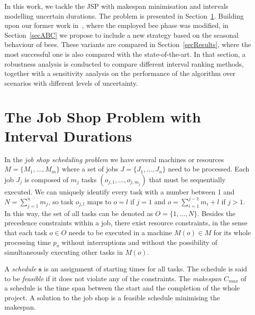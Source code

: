\documentclass[icae]{iosart2x}
\newcommand{\reviewed}[1]{#1} %
\begin{document}
In this work, we tackle the JSP with makespan minimisation and intervals modelling uncertain durations. The problem is presented in Section~\ref{secIJSP}. Building upon our former work in~\cite{Diaz2022}, where the employed bee phase was modified, in Section~\ref{secABC} we propose to include a new strategy based on the seasonal behaviour of bees. These variants are compared in Section~\ref{secResults}, where the most successful one is also compared with the state-of-the-art. In that section, a robustness analysis is conducted to compare different interval ranking methods, together with a sensitivity analysis on the performance of the algorithm over scenarios with different levels of uncertainty.

\section{The Job Shop Problem with Interval Durations}\label{secIJSP}
In the \emph{job shop scheduling problem} we have several \reviewed{machines or} resources $M=\{M_1, \dots, M_m\}$ where a set of jobs $J=\{J_1,\dots,J_n\}$ need to be processed. Each job $J_j$ is composed of $m_j$ tasks $(o_{j,1},\dots,o_{j,m_j})$ that must be sequentially executed. We can uniquely identify every task with a number between 1 and $N=\sum_{j=1}^n m_j$, so task $o_{j,l}$ maps to \reviewed{$o=l$ if $j=1$ and $o=\sum_{i=1}^{j-1} m_i+l$ if $j>1$}. In this way,  the set of all tasks can be denoted as $O=\{1,\dots, N\}$. Besides the precedence constraints within a job, there exist resource constraints, in the sense that each task $o \in O$ needs to be executed in a machine \reviewed{$M(o) \in M$} for its whole processing time $p_o$ without interruptions and without the possibility of simultaneously executing other tasks in \reviewed{$M(o)$}.

A \emph{schedule} $\boldsymbol{s}$ is an assignment of starting times for all tasks.  The schedule is said to be \emph{feasible} if it does not violate any of the constraints. The \emph{makespan} $C_{max}$ of a schedule is the time span between the start  and the completion of the whole project.  A solution to the job shop is a feasible schedule minimising the makespan.
\end{document}
